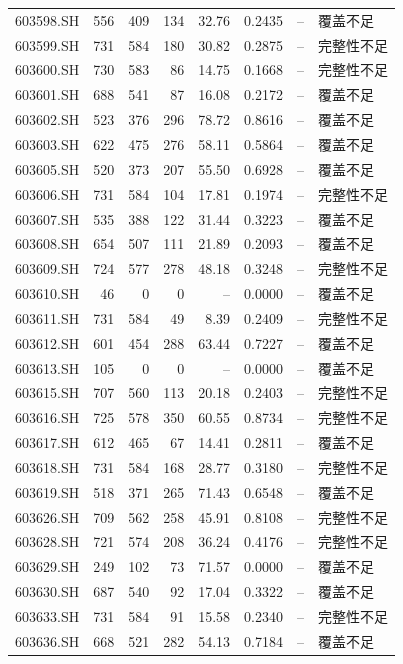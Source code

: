 \documentclass[10pt,a4paper]{article}
\begin{document}
\begin{longtable}{lrrr r r r l}
603598.SH & 556 & 409 & 134 & 32.76 & 0.2435 & -- & 覆盖不足\\
603599.SH & 731 & 584 & 180 & 30.82 & 0.2875 & -- & 完整性不足\\
603600.SH & 730 & 583 & 86 & 14.75 & 0.1668 & -- & 完整性不足\\
603601.SH & 688 & 541 & 87 & 16.08 & 0.2172 & -- & 覆盖不足\\
603602.SH & 523 & 376 & 296 & 78.72 & 0.8616 & -- & 覆盖不足\\
603603.SH & 622 & 475 & 276 & 58.11 & 0.5864 & -- & 覆盖不足\\
603605.SH & 520 & 373 & 207 & 55.50 & 0.6928 & -- & 覆盖不足\\
603606.SH & 731 & 584 & 104 & 17.81 & 0.1974 & -- & 完整性不足\\
603607.SH & 535 & 388 & 122 & 31.44 & 0.3223 & -- & 覆盖不足\\
603608.SH & 654 & 507 & 111 & 21.89 & 0.2093 & -- & 覆盖不足\\
603609.SH & 724 & 577 & 278 & 48.18 & 0.3248 & -- & 完整性不足\\
603610.SH & 46 & 0 & 0 & -- & 0.0000 & -- & 覆盖不足\\
603611.SH & 731 & 584 & 49 & 8.39 & 0.2409 & -- & 完整性不足\\
603612.SH & 601 & 454 & 288 & 63.44 & 0.7227 & -- & 覆盖不足\\
603613.SH & 105 & 0 & 0 & -- & 0.0000 & -- & 覆盖不足\\
603615.SH & 707 & 560 & 113 & 20.18 & 0.2403 & -- & 完整性不足\\
603616.SH & 725 & 578 & 350 & 60.55 & 0.8734 & -- & 完整性不足\\
603617.SH & 612 & 465 & 67 & 14.41 & 0.2811 & -- & 覆盖不足\\
603618.SH & 731 & 584 & 168 & 28.77 & 0.3180 & -- & 完整性不足\\
603619.SH & 518 & 371 & 265 & 71.43 & 0.6548 & -- & 覆盖不足\\
603626.SH & 709 & 562 & 258 & 45.91 & 0.8108 & -- & 完整性不足\\
603628.SH & 721 & 574 & 208 & 36.24 & 0.4176 & -- & 完整性不足\\
603629.SH & 249 & 102 & 73 & 71.57 & 0.0000 & -- & 覆盖不足\\
603630.SH & 687 & 540 & 92 & 17.04 & 0.3322 & -- & 覆盖不足\\
603633.SH & 731 & 584 & 91 & 15.58 & 0.2340 & -- & 完整性不足\\
603636.SH & 668 & 521 & 282 & 54.13 & 0.7184 & -- & 覆盖不足\\

\end{longtable}
\end{document}
